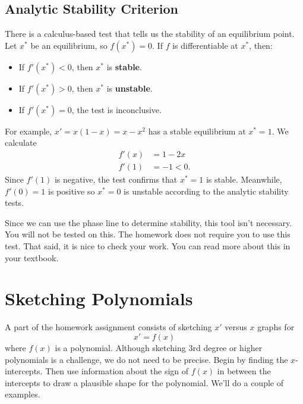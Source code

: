 \documentclass[09pt,letterpaper]{article}
\begin{document}
\subsection{Analytic Stability Criterion}
There is a calculus-based test that tells us the stability of an equilibrium point. Let $x^*$ be an equilibrium, so $f(x^*)=0$.
If $f$ is differentiable at $x^*$, then:
\begin{itemize}
    \item If $f'(x^*)<0$, then $x^*$ is \textbf{stable}.
    \item If $f'(x^*)>0$, then $x^*$ is \textbf{unstable}.
    \item If $f'(x^*)=0$, the test is inconclusive. 
\end{itemize}
For example, $x'=x(1-x)=x-x^2$ has a stable equilibrium at $x^*=1$. We calculate 
\begin{align*}    
f'(x) &= 1-2x\\
f'(1)&=-1<0.
\end{align*}
Since $f'(1)$ is negative, the test confirms that $x^*=1$ is stable. Meanwhile, $f'(0)=1$ is positive so $x^*=0$ is unstable according to the analytic stability tests. 

Since we can use the phase line to determine stability, this tool isn't necessary. You will not be tested on this. The homework does not require you to use this test.  That said, it is nice to check your work. You can read more about this in your textbook. 

\section{Sketching Polynomials}


A part of the homework assignment consists of sketching $x'$ versus $x$ graphs for
$$
x'=f(x)
$$
where $f(x)$ is a polynomial. Although sketching 3rd degree or higher polynomials is a challenge, we do not need to be precise. Begin by finding the $x$-intercepts. Then use information about the sign of $f(x)$ in between the intercepts to draw a plausible shape for the polynomial. We'll do a couple of examples.
\end{document}

